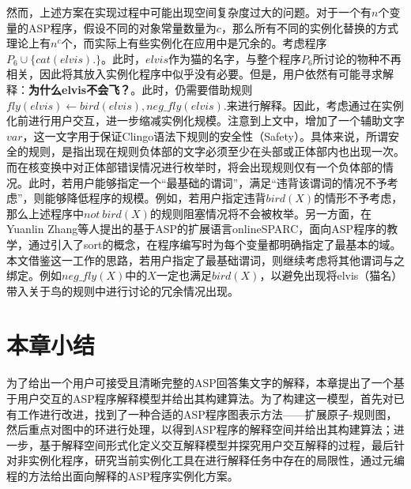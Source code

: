     然而，上述方案在实现过程中可能出现空间复杂度过大的问题。对于一个有$n$个变量的ASP程序，假设不同的对象常量数量为$c$，那么所有不同的实例化替换的方式理论上有$n^c$个，而实际上有些实例化在应用中是冗余的。考虑程序$P_6 \cup \{cat(elvis).\}$。此时，$elvis$作为猫的名字，与整个程序$P_6$所讨论的物种不再相关，因此将其放入实例化程序中似乎没有必要。但是，用户依然有可能寻求解释：\textbf{为什么elvis不会飞？}。此时，仍需要借助规则$fly(elvis) \leftarrow bird(elvis), neg\_fly(elvis).$来进行解释。因此，考虑通过在实例化前进行用户交互，进一步缩减实例化规模。注意到上文中，增加了一个辅助文字$var$，这一文字用于保证Clingo语法下规则的安全性（Safety）。具体来说，所谓安全的规则，是指出现在规则负体部的文字必须至少在头部或正体部内也出现一次\cite{calimeri2020aspcore2}。而在核变换中对正体部错误情况进行枚举时，将会出现规则仅有一个负体部的情况。此时，若用户能够指定一个“最基础的谓词”，满足“违背该谓词的情况不予考虑”，则能够降低程序的规模。例如，若用户指定违背$bird(X)$的情形不予考虑，那么上述程序中$not\ bird(X)$的规则阻塞情况将不会被枚举。另一方面，在Yuanlin Zhang等人提出的基于ASP的扩展语言\textsf{onlineSPARC}，面向ASP程序的教学，通过引入了sort的概念，在程序编写时为每个变量都明确指定了最基本的域\cite{marcopoulos2019onlinesparc, balai2013answer}。本文借鉴这一工作的思路，若用户指定了最基础谓词，则继续考虑将其他谓词与之绑定。例如$neg\_fly(X)$中的$X$一定也满足$bird(X)$，以避免出现将elvis（猫名）带入关于鸟的规则中进行讨论的冗余情况出现。


    \section{本章小结}
    为了给出一个用户可接受且清晰完整的ASP回答集文字的解释，本章提出了一个基于用户交互的ASP程序解释模型并给出其构建算法。为了构建这一模型，首先对已有工作进行改进，找到了一种合适的ASP程序图表示方法——扩展原子-规则图，然后重点对图中的环进行处理，以得到ASP程序的解释空间并给出其构建算法；进一步，基于解释空间形式化定义交互解释模型并探究用户交互解释的过程，最后针对非实例化程序，研究当前实例化工具在进行解释任务中存在的局限性，通过元编程的方法给出面向解释的ASP程序实例化方案。